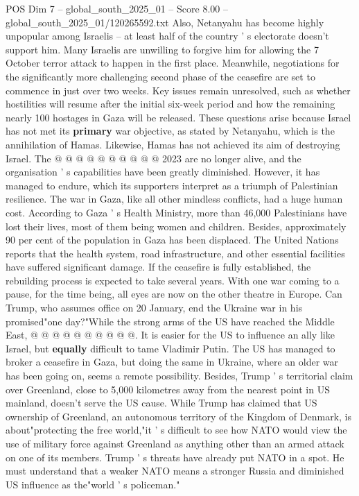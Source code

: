 \begin{textsample}{POS Dim 7 – global\_south\_2025\_01 – Score 8.00 – global\_south\_2025\_01/120265592.txt}
Also, Netanyahu has become highly unpopular among Israelis -- at least half of the country ' s electorate doesn't support him.
Many Israelis are unwilling to forgive him for allowing the 7 October terror attack to happen in the first place.
Meanwhile, negotiations for the significantly more challenging second phase of the ceasefire are set to commence in just over two weeks.
Key issues remain unresolved, such as whether hostilities will resume after the initial six-week period and how the remaining nearly 100 hostages in Gaza will be released.
These questions arise because Israel has not met its \textbf{primary} war objective, as stated by Netanyahu, which is the annihilation of Hamas.
Likewise, Hamas has not achieved its aim of destroying Israel.
The @ @ @ @ @ @ @ @ @ @ 2023 are no longer alive, and the organisation ' s capabilities have been greatly diminished.
However, it has managed to endure, which its supporters interpret as a triumph of Palestinian resilience.
The war in Gaza, like all other mindless conflicts, had a huge human cost.
According to Gaza ' s Health Ministry, more than 46,000 Palestinians have lost their lives, most of them being women and children.
Besides, approximately 90 per cent of the population in Gaza has been displaced.
The United Nations reports that the health system, road infrastructure, and other essential facilities have suffered significant damage.
If the ceasefire is fully established, the rebuilding process is expected to take several years.
With one war coming to a pause, for the time being, all eyes are now on the other theatre in Europe.
Can Trump, who assumes office on 20 January, end the Ukraine war in his promised"one day?"While the strong arms of the US have reached the Middle East, @ @ @ @ @ @ @ @ @ @.
It is easier for the US to influence an ally like Israel, but \textbf{equally} difficult to tame Vladimir Putin.
The US has managed to broker a ceasefire in Gaza, but doing the same in Ukraine, where an older war has been going on, seems a remote possibility.
Besides, Trump ' s territorial claim over Greenland, close to 5,000 kilometres away from the nearest point in US mainland, doesn't serve the US cause.
While Trump has claimed that US ownership of Greenland, an autonomous territory of the Kingdom of Denmark, is about"protecting the free world,"it ' s difficult to see how NATO would view the use of military force against Greenland as anything other than an armed attack on one of its members.
Trump ' s threats have already put NATO in a spot.
He must understand that a weaker NATO means a stronger Russia and diminished US influence as the"world ' s policeman."

\end{textsample}
